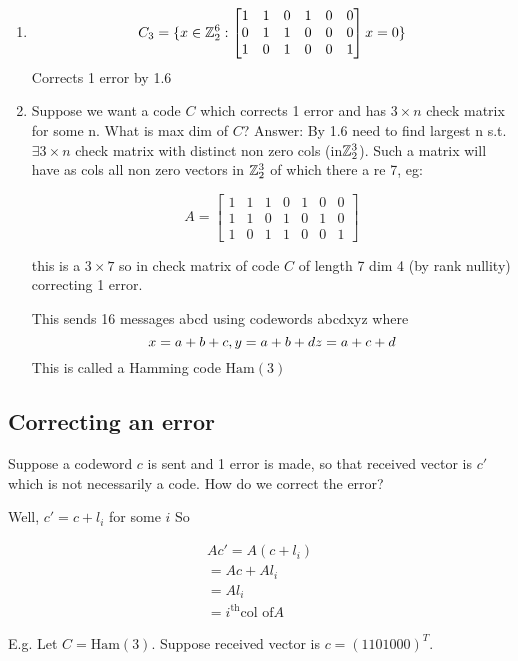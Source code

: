 \documentclass[]{amsart}
\theoremstyle{definition}
\theoremstyle{remark}
\numberwithin{equation}{section}
\begin{document}
\begin{enumerate}
\item 
\[C_3 = \{
	x \in \mathbb{Z}_2^6 : \begin{bmatrix}
	1 & 1 & 0 & 1 & 0 & 0 \\
	0 & 1 & 1 & 0 & 0 & 0 \\
	1 & 0 & 1 & 0 & 0 & 1
	\end{bmatrix}x = 0
\}\]
Corrects 1 error by 1.6

\item Suppose we want a code $C$ which corrects 1 error and has $3 \times n$ check matrix for some n. What is max dim of $C$?
Answer:
By 1.6 need to find largest n s.t. $\exists 3 \times n $ check matrix with distinct non zero cols (in$\mathbb{Z}_2^3$). Such a matrix will have as cols all non zero vectors in $\mathbb{Z}_2^3$ of which there a re 7, eg:

\[
A = \begin{bmatrix}
	1 & 1 & 1 & 0 & 1 & 0 & 0 \\
	1 & 1 & 0 & 1 & 0 & 1 & 0 \\
	1 & 0 & 1 & 1 & 0 & 0 & 1
	\end{bmatrix}
\]

this is a $3\times 7$ so in check matrix of code $C$ of length 7 dim 4 (by rank nullity) correcting 1 error.

This sends 16 messages abcd using codewords abcdxyz where 
\[
	x = a + b + c,\\
	y = a +b + d \\
	z = a + c + d
\]
This is called a Hamming code $\text{Ham}(3)$

\end{enumerate}
\subsection{Correcting an error}
Suppose a codeword $c$ is sent and 1 error is made, so that received vector is $c'$ which is not necessarily a code. How do we correct the error?

Well, $c' = c + l_i$ for some $i$
So

\begin{align}
	Ac' = A(c+l_i) \\
		= Ac + Al_i \\
		= Al_i \\
		= i^\text{th} \text{col of} A
\end{align}

E.g. Let $C = \text{Ham}(3)$.
Suppose received vector is $c= (1101000)^T$.
\end{document}
